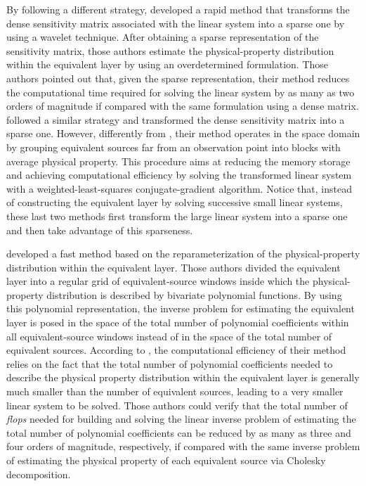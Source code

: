 By following a different strategy, \citet{li-oldenburg2010} developed a rapid method that transforms the 
dense sensitivity matrix associated with the linear system into a sparse one by using a wavelet technique. 
After obtaining a sparse representation of the sensitivity matrix, those authors estimate the 
physical-property distribution within the equivalent layer by using an overdetermined formulation. 
Those authors pointed out that, given the sparse representation, their method reduces the computational time 
required for solving the linear system by as many as two orders of magnitude if compared with the same 
formulation using a dense matrix. 
\citet{barnes-lumley2011} followed a similar strategy and transformed the dense sensitivity matrix 
into a sparse one. However, differently from \citet{li-oldenburg2010}, their method operates in the space 
domain by grouping equivalent sources far from an observation point into blocks with average physical 
property. This procedure aims at reducing the memory storage and achieving computational efficiency 
by solving the transformed linear system with a weighted-least-squares conjugate-gradient algorithm.
Notice that, instead of constructing the equivalent layer by solving successive small linear systems, 
these last two methods first transform the large linear system into a sparse one and then take advantage of 
this sparseness.

\citet{oliveirajr-etal2013} developed a fast method based on the reparameterization of the physical-property 
distribution within the equivalent layer. Those authors divided the equivalent layer into a regular grid of 
equivalent-source windows inside which the physical-property distribution is described by bivariate 
polynomial functions. By using this polynomial representation, the inverse problem for estimating the 
equivalent layer is posed in the space of the total number of polynomial coefficients within all 
equivalent-source windows instead of in the space of the total number of equivalent sources. According to 
\citet{oliveirajr-etal2013}, the computational efficiency of their method relies on the fact that the total 
number of polynomial coefficients needed to describe the physical property distribution within the 
equivalent layer is generally much smaller than the number of equivalent sources, leading to a very smaller 
linear system to be solved. Those authors could verify that the total number of \textit{flops} needed for 
building and solving the linear inverse problem of estimating the total number of polynomial coefficients can 
be reduced by as many as three and four orders of magnitude, respectively, if compared with the same inverse 
problem of estimating the physical property of each equivalent source via Cholesky decomposition.

